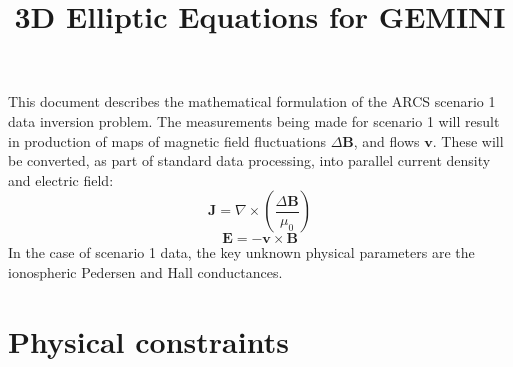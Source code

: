 \documentclass[11pt,letterpaper]{article}
\begin{document}
\setlength{\parindent}{0mm}
\setlength{\parskip}{0.4cm}




\title{3D Elliptic Equations for GEMINI}

\maketitle

\tableofcontents

\pagebreak


This document describes the mathematical formulation of the ARCS scenario 1 data inversion problem.  The measurements being made for scenario 1 will result in production of maps of magnetic field fluctuations $\Delta \mathbf{B}$, and flows $\mathbf{v}$.  These will be converted, as part of standard data processing, into parallel current density and electric field:
\begin{equation}
\mathbf{J} = \nabla \times \left( \frac{\Delta \mathbf{B}}{\mu_0} \right)
\end{equation}
\begin{equation}
\mathbf{E} = -\mathbf{v} \times \mathbf{B}
\end{equation}
In the case of scenario 1 data, the key unknown physical parameters are the ionospheric Pedersen and Hall conductances.  

\section{Physical constraints}
\end{document}
